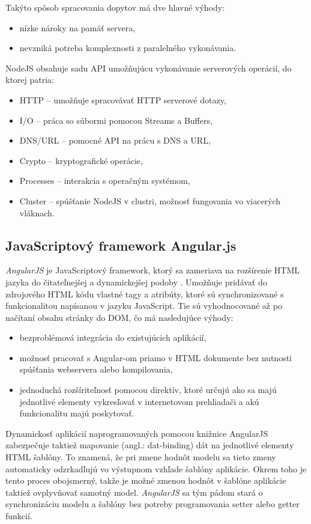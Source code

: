 Takýto spôsob spracovania dopytov má dve hlavné výhody:
\begin{itemize}
	\item nízke nároky na pamäť servera,
	\item nevzniká potreba komplexnosti z paralelného vykonávania.
\end{itemize}

NodeJS obsahuje sadu API umožňujúcu vykonávanie serverových operácií, do ktorej patria:
\begin{itemize}
	\item HTTP -- umožňuje spracovávať HTTP serverové dotazy,
	\item I/O -- práca so súbormi pomocou Streams a Buffers,
	\item DNS/URL -- pomocné API na prácu s DNS a URL,
	\item Crypto -- kryptografické operácie,
	\item Processes -- interakcia s operačným systémom,
	\item Cluster -- spúšťanie NodeJS v clustri, možnosť fungovania vo viacerých vláknach.
\end{itemize}


\subsection{JavaScriptový framework Angular.js}\label{sec:angular}

\textit{AngularJS} je JavaScriptový framework, ktorý sa zameriava na rozšírenie HTML jazyka do čitateľnejšej a dynamickejšej podoby \cite{jain2015angularjs}. Umožňuje pridávať do zdrojového HTML kódu vlastné tagy a atribúty, ktoré sú synchronizované s funkcionalitou napísanou v jazyku JavaScript. Tie sú vyhodnocované až po načítaní obsahu stránky do DOM, čo má nasledujúce výhody:
\begin{itemize}
	\item bezproblémová integrácia do existujúcich aplikácií,
	\item možnosť pracovať s Angular-om priamo v HTML dokumente bez nutnosti spúšťania webservera alebo kompilovania,
	\item jednoduchá rozšíriteľnosť pomocou direktív, ktoré určujú ako sa majú jednotlivé elementy vykresľovať v internetovom prehliadači a akú funkcionalitu majú poskytovať.
\end{itemize}

Dynamickosť aplikácií naprogramovaných pomocou knižnice AngularJS zabezpečuje taktiež mapovanie (angl.: dat-binding) dát na jednotlivé elementy HTML šablóny. To znamená, že pri zmene hodnôt modelu sa tieto zmeny automaticky odzrkadľujú vo výstupnom vzhľade šablóny aplikácie. Okrem toho je tento proces obojsmerný, takže je možné zmenou hodnôt v šablóne aplikácie taktiež ovplyvňovať samotný model. \textit{AngularJS} sa tým pádom stará o synchronizáciu modelu a šablóny bez potreby programovania setter alebo getter funkcií.

